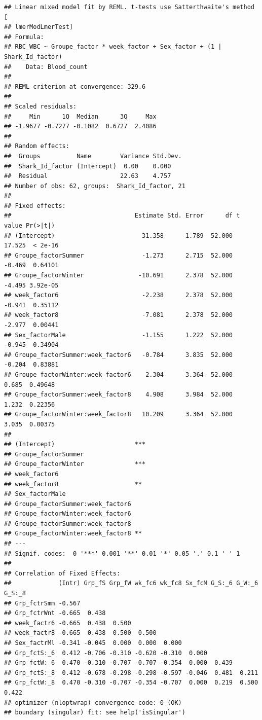 \documentclass[
]{article}
\begin{document}
\begin{verbatim}
## Linear mixed model fit by REML. t-tests use Satterthwaite's method [
## lmerModLmerTest]
## Formula: 
## RBC_WBC ~ Groupe_factor * week_factor + Sex_factor + (1 | Shark_Id_factor)
##    Data: Blood_count
## 
## REML criterion at convergence: 329.6
## 
## Scaled residuals: 
##     Min      1Q  Median      3Q     Max 
## -1.9677 -0.7277 -0.1082  0.6727  2.4086 
## 
## Random effects:
##  Groups          Name        Variance Std.Dev.
##  Shark_Id_factor (Intercept)  0.00    0.000   
##  Residual                    22.63    4.757   
## Number of obs: 62, groups:  Shark_Id_factor, 21
## 
## Fixed effects:
##                                  Estimate Std. Error      df t value Pr(>|t|)
## (Intercept)                        31.358      1.789  52.000  17.525  < 2e-16
## Groupe_factorSummer                -1.273      2.715  52.000  -0.469  0.64101
## Groupe_factorWinter               -10.691      2.378  52.000  -4.495 3.92e-05
## week_factor6                       -2.238      2.378  52.000  -0.941  0.35112
## week_factor8                       -7.081      2.378  52.000  -2.977  0.00441
## Sex_factorMale                     -1.155      1.222  52.000  -0.945  0.34904
## Groupe_factorSummer:week_factor6   -0.784      3.835  52.000  -0.204  0.83881
## Groupe_factorWinter:week_factor6    2.304      3.364  52.000   0.685  0.49648
## Groupe_factorSummer:week_factor8    4.908      3.984  52.000   1.232  0.22356
## Groupe_factorWinter:week_factor8   10.209      3.364  52.000   3.035  0.00375
##                                     
## (Intercept)                      ***
## Groupe_factorSummer                 
## Groupe_factorWinter              ***
## week_factor6                        
## week_factor8                     ** 
## Sex_factorMale                      
## Groupe_factorSummer:week_factor6    
## Groupe_factorWinter:week_factor6    
## Groupe_factorSummer:week_factor8    
## Groupe_factorWinter:week_factor8 ** 
## ---
## Signif. codes:  0 '***' 0.001 '**' 0.01 '*' 0.05 '.' 0.1 ' ' 1
## 
## Correlation of Fixed Effects:
##             (Intr) Grp_fS Grp_fW wk_fc6 wk_fc8 Sx_fcM G_S:_6 G_W:_6 G_S:_8
## Grp_fctrSmm -0.567                                                        
## Grp_fctrWnt -0.665  0.438                                                 
## week_factr6 -0.665  0.438  0.500                                          
## week_factr8 -0.665  0.438  0.500  0.500                                   
## Sex_factrMl -0.341 -0.045  0.000  0.000  0.000                            
## Grp_fctS:_6  0.412 -0.706 -0.310 -0.620 -0.310  0.000                     
## Grp_fctW:_6  0.470 -0.310 -0.707 -0.707 -0.354  0.000  0.439              
## Grp_fctS:_8  0.412 -0.678 -0.298 -0.298 -0.597 -0.046  0.481  0.211       
## Grp_fctW:_8  0.470 -0.310 -0.707 -0.354 -0.707  0.000  0.219  0.500  0.422
## optimizer (nloptwrap) convergence code: 0 (OK)
## boundary (singular) fit: see help('isSingular')
\end{verbatim}
\end{document}
